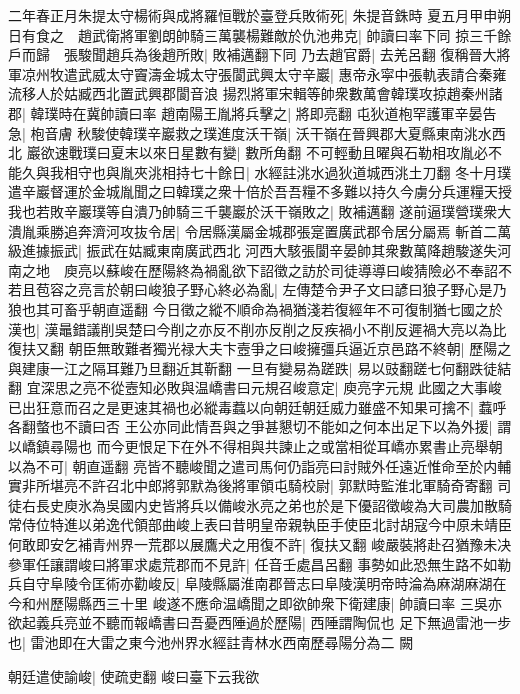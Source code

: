 二年春正月朱提太守楊術與成將羅恒戰於臺登兵敗術死|{
	朱提音銖時}
夏五月甲申朔日有食之　趙武衛將軍劉朗帥騎三萬襲楊難敵於仇池弗克|{
	帥讀曰率下同}
掠三千餘戶而歸　張駿聞趙兵為後趙所敗|{
	敗補邁翻下同}
乃去趙官爵|{
	去羌呂翻}
復稱晉大將軍凉州牧遣武威太守竇濤金城太守張閬武興太守辛巖|{
	惠帝永寜中張軌表請合秦雍流移人於姑臧西北置武興郡閬音浪}
揚烈將軍宋輯等帥衆數萬會韓璞攻掠趙秦州諸郡|{
	韓璞時在冀帥讀曰率}
趙南陽王胤將兵擊之|{
	將即亮翻}
屯狄道枹罕護軍辛晏告急|{
	枹音膚}
秋駿使韓璞辛巖救之璞進度沃干嶺|{
	沃干嶺在晉興郡大夏縣東南洮水西北}
巖欲速戰璞曰夏末以來日星數有變|{
	數所角翻}
不可輕動且曜與石勒相攻胤必不能久與我相守也與胤夾洮相持七十餘日|{
	水經註洮水過狄道城西洮土刀翻}
冬十月璞遣辛巖督運於金城胤聞之曰韓璞之衆十倍於吾吾糧不多難以持久今虜分兵運糧天授我也若敗辛巖璞等自潰乃帥騎三千襲巖於沃干嶺敗之|{
	敗補邁翻}
遂前逼璞營璞衆大潰胤乘勝追奔濟河攻抜令居|{
	令居縣漢屬金城郡張寔置廣武郡令居分屬焉}
斬首二萬級進據振武|{
	振武在姑臧東南廣武西北}
河西大駭張閬辛晏帥其衆數萬降趙駿遂失河南之地　庾亮以蘇峻在歷陽終為禍亂欲下詔徵之訪於司徒導導曰峻猜險必不奉詔不若且苞容之亮言於朝曰峻狼子野心終必為亂|{
	左傳楚令尹子文曰諺曰狼子野心是乃狼也其可畜乎朝直遥翻}
今日徵之縱不順命為禍猶淺若復經年不可復制猶七國之於漢也|{
	漢鼂錯議削吳楚曰今削之亦反不削亦反削之反疾禍小不削反遲禍大亮以為比復扶又翻}
朝臣無敢難者獨光禄大夫卞壼爭之曰峻擁彊兵逼近京邑路不終朝|{
	歷陽之與建康一江之隔耳難乃旦翻近其靳翻}
一旦有變易為蹉跌|{
	易以豉翻蹉七何翻跌徒結翻}
宜深思之亮不從壼知必敗與温嶠書曰元規召峻意定|{
	庾亮字元規}
此國之大事峻已出狂意而召之是更速其禍也必縱毒蠚以向朝廷朝廷威力雖盛不知果可擒不|{
	蠚呼各翻螫也不讀曰否}
王公亦同此情吾與之爭甚懇切不能如之何本出足下以為外援|{
	謂以嶠鎮尋陽也}
而今更恨足下在外不得相與共諫止之或當相從耳嶠亦累書止亮舉朝以為不可|{
	朝直遥翻}
亮皆不聽峻聞之遣司馬何仍詣亮曰討賊外任遠近惟命至於内輔實非所堪亮不許召北中郎將郭默為後將軍領屯騎校尉|{
	郭默時監淮北軍騎奇寄翻}
司徒右長史庾氷為吳國内史皆將兵以備峻氷亮之弟也於是下優詔徵峻為大司農加散騎常侍位特進以弟逸代領部曲峻上表曰昔明皇帝親執臣手使臣北討胡寇今中原未靖臣何敢即安乞補青州界一荒郡以展鷹犬之用復不許|{
	復扶又翻}
峻嚴裝將赴召猶豫未决參軍任讓謂峻曰將軍求處荒郡而不見許|{
	任音壬處昌呂翻}
事勢如此恐無生路不如勒兵自守阜陵令匡術亦勸峻反|{
	阜陵縣屬淮南郡晉志曰阜陵漢明帝時淪為麻湖麻湖在今和州歷陽縣西三十里}
峻遂不應命温嶠聞之即欲帥衆下衛建康|{
	帥讀曰率}
三吳亦欲起義兵亮並不聽而報嶠書曰吾憂西陲過於歷陽|{
	西陲謂陶侃也}
足下無過雷池一步也|{
	雷池即在大雷之東今池州界水經註青林水西南歷尋陽分為二}
闕

朝廷遣使諭峻|{
	使疏吏翻}
峻曰臺下云我欲

